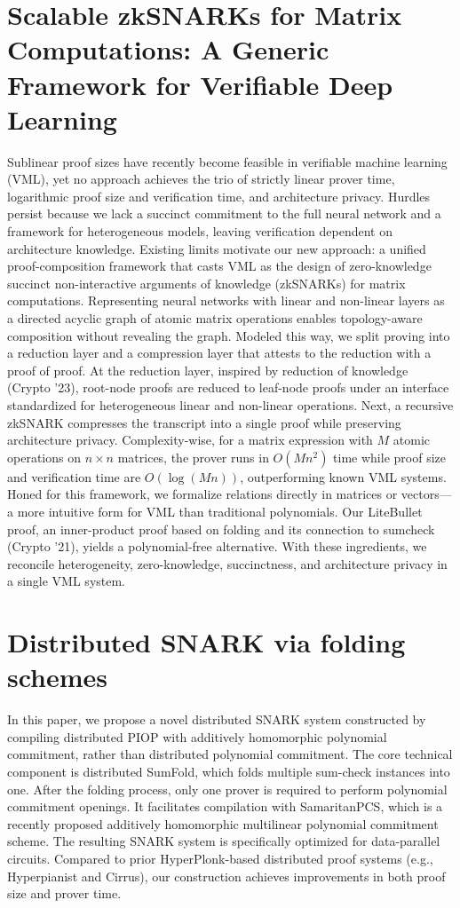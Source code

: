 \documentclass[11pt]{article}
\theoremstyle{definition}
\theoremstyle{remark}
\theoremstyle{plain}
\begin{document}
\section{\cite{cryptoeprint:2025/1646} Scalable zkSNARKs for Matrix Computations: A Generic Framework for Verifiable Deep Learning}
Sublinear proof sizes have recently become feasible in verifiable machine learning (VML), yet no approach achieves the trio of strictly linear prover time, logarithmic proof size and verification time, and architecture privacy. Hurdles persist because we lack a succinct commitment to the full neural network and a framework for heterogeneous models, leaving verification dependent on architecture knowledge. Existing limits motivate our new approach: a unified proof-composition framework that casts VML as the design of zero-knowledge succinct non-interactive arguments of knowledge (zkSNARKs) for matrix computations. Representing neural networks with linear and non-linear layers as a directed acyclic graph of atomic matrix operations enables topology-aware composition without revealing the graph. Modeled this way, we split proving into a reduction layer and a compression layer that attests to the reduction with a proof of proof. At the reduction layer, inspired by reduction of knowledge (Crypto '23), root-node proofs are reduced to leaf-node proofs under an interface standardized for heterogeneous linear and non-linear operations. Next, a recursive zkSNARK compresses the transcript into a single proof while preserving architecture privacy. Complexity-wise, for a matrix expression with $M$ atomic operations on $n \times n$ matrices, the prover runs in $O(M n^2)$ time while proof size and verification time are $O(\log(M n))$, outperforming known VML systems. Honed for this framework, we formalize relations directly in matrices or vectors---a more intuitive form for VML than traditional polynomials. Our LiteBullet proof, an inner-product proof based on folding and its connection to sumcheck (Crypto '21), yields a polynomial-free alternative. With these ingredients, we reconcile heterogeneity, zero-knowledge, succinctness, and architecture privacy in a single VML system.

\section{\cite{cryptoeprint:2025/1653} Distributed SNARK via folding schemes}
In this paper, we propose a novel distributed SNARK system constructed by compiling distributed PIOP with additively homomorphic polynomial commitment, rather than distributed polynomial commitment. The core technical component is distributed SumFold, which folds multiple sum-check instances into one. After the folding process, only one prover is required to perform polynomial commitment openings. It facilitates compilation with SamaritanPCS, which is a recently proposed additively homomorphic multilinear polynomial commitment scheme. The resulting SNARK system is specifically optimized for data-parallel circuits. Compared to prior HyperPlonk-based distributed proof systems (e.g., Hyperpianist and Cirrus), our construction achieves improvements in both proof size and prover time.
\end{document}
